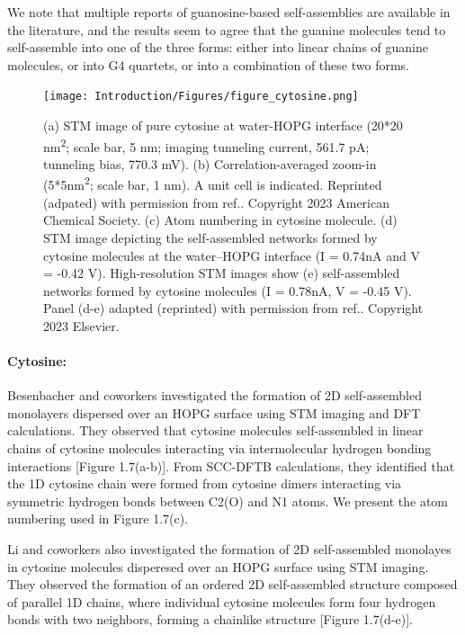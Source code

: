 We note that multiple reports of guanosine-based self-assemblies are available in the literature\supercite{spada_guanosine-based_2008,xu_directional_2021,ciesielski_dynamers_2010,ciesielski_nanopatterning_2010,gottarelli_self-assembly_2000}, and the results seem to agree that the guanine molecules tend to self-assemble into one of the three forms: either into linear chains of guanine molecules, or into G4 quartets, or into a combination of these two forms. 

\begin{figure}[h]
    \centering
    \texttt{[image: Introduction/Figures/figure\_cytosine.png]}
    \caption[STM images for cytosine self-assemblies over graphene]{(a) STM image of pure cytosine at water-HOPG interface (20*20  nm\textsuperscript{2};  scale bar, 5 nm; imaging tunneling current, 561.7 pA; tunneling bias, 770.3 mV). (b) Correlation-averaged zoom-in (5*5nm\textsuperscript{2}; scale bar, 1 nm). A unit cell is indicated. Reprinted (adpated) with permission from ref.\supercite{xu_coadsorption_2006}. Copyright 2023 American Chemical Society. (c) Atom numbering in cytosine molecule. (d) STM image depicting the self-assembled networks formed by cytosine molecules at the water–HOPG interface (I = 0.74nA and V = -0.42 V). High-resolution STM images show (e) self-assembled networks formed by cytosine molecules (I = 0.78nA, V = -0.45 V). Panel (d-e) adapted (reprinted) with permission from ref.\supercite{xu_directional_2021}. Copyright 2023 Elsevier.}
    \label{fig:figure7}
\end{figure}

\paragraph{Cytosine:} Besenbacher and coworkers investigated the formation of 2D self-assembled monolayers dispersed over an HOPG surface using STM imaging and DFT calculations\supercite{xu_coadsorption_2006}. They observed that cytosine molecules self-assembled in linear chains of cytosine molecules interacting via intermolecular hydrogen bonding interactions [Figure 1.7(a-b)]. From SCC-DFTB calculations, they identified that the 1D cytosine chain were formed from cytosine dimers interacting via symmetric hydrogen bonds between C2(O) and N1 atoms. We present the atom numbering used in Figure 1.7(c).

Li and coworkers also investigated the formation of 2D self-assembled monolayes in cytosine molecules disperesed over an HOPG surface using STM imaging\supercite{xu_directional_2021}. They observed the formation of an ordered 2D self-assembled structure composed of parallel 1D chains, where individual cytosine molecules form four hydrogen bonds with two neighbors, forming a chainlike structure [Figure 1.7(d-e)].

